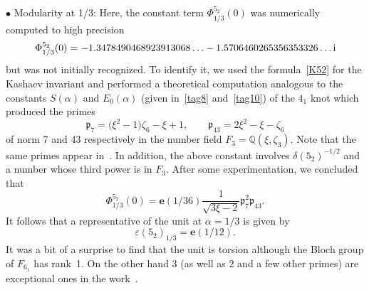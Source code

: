 \documentclass[pdftex]{sigma}
\numberwithin{equation}{section}
\def\BQ{\mathbb Q}
\def\z{\zeta}
\def\e{\mathbf{e}}
\def\a{\alpha}
\def\p{\mathfrak p}
\def\e{\mathbf{e}}
\def\a{\alpha}
\def\z{\zeta}
\def\ve{\varepsilon}
\begin{document}
$\bullet$ Modularity at 1/3:
Here, the constant term $\Phi^{5_2}_{1/3}(0)$ was numerically computed to
high precision
\[
\Phi^{5_2}_{1/3}(0)=
-1.3478490468923913068\ldots - 1.5706460265356353326\dots {\rm i}
\]
but was not initially recognized. To identify it,
we used the formula~\eqref{K52} for the Kashaev invariant and performed
a theoretical computation analogous to the constants $S(\a)$ and $E_0(\a)$
(given in~\eqref{tag8} and~\eqref{tag10}) of the $4_1$ knot which produced
the primes
\[
\p_7 = \big(\xi^2-1\big) \z_6 - \xi + 1, \qquad \p_{43} = 2\xi^2-\xi - \z_6
\]
of norm 7 and 43 respectively in the number field $F_3=\BQ(\xi,\z_3)$.
Note that the same primes appear in~\cite[Section~6.2]{DG2}.
In addition, the above constant involves $\delta(5_2)^{-1/2}$ and a number
whose third power is in $F_3$. After some experimentation, we concluded that
\[
\Phi^{5_2}_{1/3}(0)= \e(1/36)
\frac{1}{\sqrt{3\xi-2}}  \p_7^2  \p_{43} .
\]
It follows that a representative of the unit at $\a=1/3$ is given by
\[%
\ve(5_2)_{1/3} =\e(1/12) .
\]
It was a bit of a surprise to find that the unit is torsion although the
Bloch group of $F_{6_1}$ has rank~1. On the other hand
$3$ (as well as $2$ and a few other primes) are exceptional ones in the
work~\cite{CGZ}.
\end{document}
